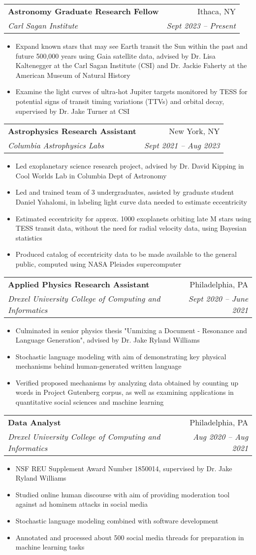 \documentclass[a4paper,11pt]{article}
\makeatletter
\newcommand{\resumeItem}[1]{
  \item\small{
    {#1 \vspace{-2pt}}
  }
}
\newcommand{\resumeSubheading}[4]{
  \vspace{-2pt}\item
    \begin{tabular*}{0.97\textwidth}[t]{l@{\extracolsep{\fill}}r}
      \textbf{#1} & #2 \\
      \textit{\small#3} & \textit{\small #4} \\
    \end{tabular*}\vspace{-7pt}
}
\newcommand{\resumeItemListStart}{\begin{itemize}}
\newcommand{\resumeItemListEnd}{\end{itemize}\vspace{-5pt}}
\makeatother
\begin{document}
  \resumeSubheading
      {Astronomy Graduate Research Fellow}{Ithaca, NY}
      {Carl Sagan Institute}{Sept 2023 -- Present}
      \resumeItemListStart
        \resumeItem{Expand known stars that may see Earth transit the Sun within the past and future 500,000 years using Gaia satellite data, advised by Dr. Lisa Kaltenegger at the Carl Sagan Institute (CSI) and Dr. Jackie Faherty at the American Museum of Natural History}
        \resumeItem{Examine the light curves of ultra-hot Jupiter targets monitored by TESS for potential signs of transit timing variations (TTVs) and orbital decay, supervised by Dr. Jake Turner at CSI}
      \resumeItemListEnd

    \resumeSubheading
      {Astrophysics Research Assistant}{New York, NY}
      {Columbia Astrophysics Labs}{Sept 2021 -- Aug 2023}
      \resumeItemListStart
        \resumeItem{Led exoplanetary science research project, advised by Dr. David Kipping
        in Cool Worlds Lab in Columbia Dept of Astronomy}
        \resumeItem{Led and trained team of 3 undergraduates, assisted by graduate student Daniel Yahalomi, in labeling light curve data needed to estimate eccentricity}
        \resumeItem{Estimated eccentricity for approx. 1000 exoplanets orbiting late M stars using TESS transit data, without the need for radial velocity data, using Bayesian statistics}
        \resumeItem{Produced catalog of eccentricity data to be made available to the general public, computed using NASA Pleiades supercomputer}
      \resumeItemListEnd
  
    \resumeSubheading
      {Applied Physics Research Assistant}{Philadelphia, PA}
      {Drexel University College of Computing and Informatics}{Sept 2020 -- June 2021}
      \resumeItemListStart
        \resumeItem{Culminated in senior physics thesis "Unmixing a Document - Resonance and Language Generation", advised by Dr. Jake Ryland Williams}
        \resumeItem{Stochastic language modeling with aim of demonstrating key physical mechanisms behind human-generated written language}
        \resumeItem{Verified proposed mechanisms by analyzing data obtained by counting up words in Project Gutenberg corpus, as well as examining applications in quantitative social sciences and machine learning}
      \resumeItemListEnd

    \resumeSubheading
      {Data Analyst}{Philadelphia, PA}
      {Drexel University College of Computing and Informatics}{Aug 2020 -- Aug 2021}
      \resumeItemListStart
        \resumeItem{NSF REU Supplement Award Number 1850014, supervised by Dr. Jake Ryland Williams}
        \resumeItem{Studied online human discourse with aim of providing moderation tool against ad hominem attacks in social media}
        \resumeItem{Stochastic language modeling combined with software development}
        \resumeItem{Annotated and processed about 500 social media threads for preparation in machine learning tasks}
      \resumeItemListEnd
      
\end{document}
